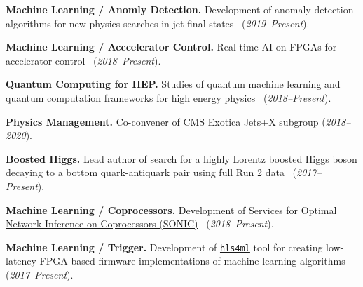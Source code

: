 \documentclass[11pt]{res}
\begin{document}
\begin{resume}
\textbf{Machine Learning / Anomly Detection.} Development of anomaly detection algorithms for new physics searches in jet final states~\cite{Kasieczka:2021xcg,Wozniak:2020} (\textit{2019--Present}).

\textbf{Machine Learning / Acccelerator Control.} Real-time AI on FPGAs for accelerator control~\cite{John:2020sak} (\textit{2018--Present}).

\textbf{Quantum Computing for HEP.} Studies of quantum machine learning and quantum computation frameworks for high energy physics~\cite{Zlokapa:2019tkn} (\textit{2018--Present}).

\textbf{Physics Management.} Co-convener of CMS Exotica Jets+X subgroup (\textit{2018--2020}).

\textbf{Boosted Higgs.} Lead author of search for a highly Lorentz boosted Higgs boson
  decaying to a bottom quark-antiquark pair using full Run 2 data~\cite{Sirunyan:2020hwz} (\textit{2017--Present}).

\textbf{Machine Learning / Coprocessors.} Development of \href{https://github.com/fastmachinelearning/SonicCMS}{Services for Optimal Network Inference on Coprocessors (SONIC)}~\cite{Krupa:2020bwg,Rankin:2020usv,neurips2019_sonic,Duarte:2019fta} (\textit{2018--Present}).

\textbf{Machine Learning / Trigger.} Development of \href{https://fastmachinelearning.org/hls4ml/}{\texttt{hls4ml}} tool for creating low-latency FPGA-based firmware implementations of machine learning algorithms~\cite{Iiyama:2020wap,Heintz:2020soy,DiGuglielmo:2020eqx,Summers:2020xiy,neurips2019_hls4ml,Duarte:2018ite} (\textit{2017--Present}).


\end{resume}
\end{document}
